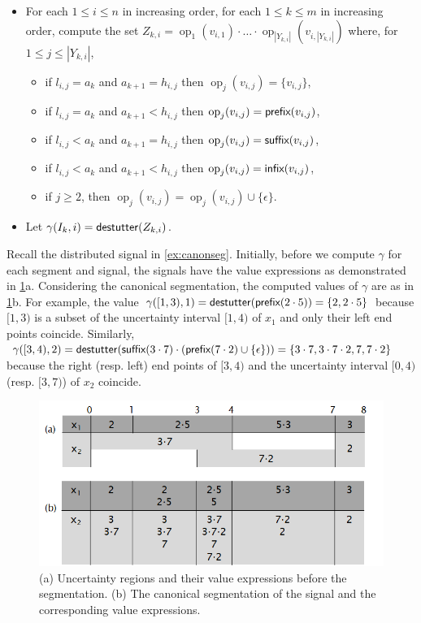 \begin{itemize}
	\item For each $1 \leq i \leq n$ in increasing order, for each $1 \leq k \leq m$ in increasing order, compute the set $Z_{k,i} = \operatorname{op}_1(v_{i,1}) \cdot \ldots \cdot \operatorname{op}_{|Y_{k,i}|}(v_{i,|Y_{k,i}|})$ where, for $1 \leq j \leq |Y_{k,i}|$,
	\begin{itemize}
		\item if $l_{i,j} = a_k$ and $a_{k+1} = h_{i,j}$ then $\operatorname{op}_j(v_{i,j}) = \{v_{i,j}\}$,
		\item if $l_{i,j} = a_k$ and $a_{k+1} < h_{i,j}$ then $\operatorname{op}_j(v_{i,j}) = \textsf{prefix}(v_{i,j})$,
		\item if $l_{i,j} < a_k$ and $a_{k+1} = h_{i,j}$ then $\operatorname{op}_j(v_{i,j}) = \textsf{suffix}(v_{i,j})$,
		\item if $l_{i,j} < a_k$ and $a_{k+1} < h_{i,j}$ then $\operatorname{op}_j(v_{i,j}) = \textsf{infix}(v_{i,j})$,
		\item if $j \geq 2$, then $\operatorname{op}_j(v_{i,j}) = \operatorname{op}_j(v_{i,j}) \cup \{\epsilon\}$.
	\end{itemize}
	\item Let $\gamma(I_k, i) = \mathsf{destutter}(Z_{k,i})$.
\end{itemize}

\begin{example}
	Recall the distributed signal in \cref{ex:canonseg}.
	Initially, before we compute $\gamma$ for each segment and signal, the signals have the value expressions as demonstrated in \cref{fig:valexpr}a.
	Considering the canonical segmentation, the computed values of $\gamma$ are as in \cref{fig:valexpr}b.
	For example, the value $\gamma([1,3),1) = \mathsf{destutter}(\textsf{prefix}(2 \cdot 5)) = \{2, 2 \cdot 5\}$ because $[1,3)$ is a subset of the uncertainty interval $[1,4)$ of $x_1$ and only their left end points coincide.
	Similarly, $\gamma([3,4),2) = \mathsf{destutter}(\textsf{suffix}(3 \cdot 7) \cdot (\textsf{prefix}(7 \cdot 2) \cup \{\epsilon\})) = \{3 \cdot 7, 3 \cdot 7 \cdot 2, 7, 7 \cdot 2\}$ because the right (resp. left) end points of $[3,4)$ and the uncertainty interval $[0,4)$ (resp. $[3,7)$) of $x_2$ coincide.
\end{example}

\begin{figure} 
	\centering
	\includegraphics[scale=0.4]{valexpr.png}
	\caption{(a) Uncertainty regions and their value expressions before the segmentation. (b) The canonical segmentation of the signal and the corresponding value expressions.\label{fig:valexpr}}
\end{figure}

